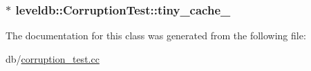 \subsubsection[{tiny\+\_\+cache\+\_\+}]{$\ast$ leveldb\+::\+Corruption\+Test\+::tiny\+\_\+cache\+\_\+}\label{classleveldb_1_1_corruption_test_afc8ff2f272ee3da2756acc21c37750d5}


The documentation for this class was generated from the following file\+:\begin{DoxyCompactItemize}
\item 
db/\hyperlink{corruption__test_8cc}{corruption\+\_\+test.\+cc}\end{DoxyCompactItemize}
